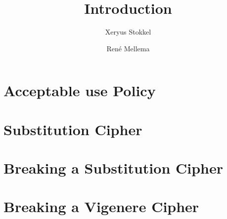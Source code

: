 \documentclass[a4paper, 10pt]{article}
\title{Introduction}
\author{Xeryus Stokkel \and Ren\'e Mellema}
\date{} %
\begin{document}
\maketitle

\section{Acceptable use Policy}


\section{Substitution Cipher}


\section{Breaking a Substitution Cipher}


\section{Breaking a Vigenere Cipher}

\end{document}
